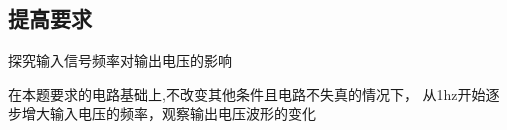 \documentclass[10pt, conference, compsocconf, a4paper]{IEEEtran}
\begin{document}
\subsection{提高要求}
探究输入信号频率对输出电压的影响\par
在本题要求的电路基础上,不改变其他条件且电路不失真的情况下，
从1hz开始逐步增大输入电压的频率，观察输出电压波形的变化

\end{document}
